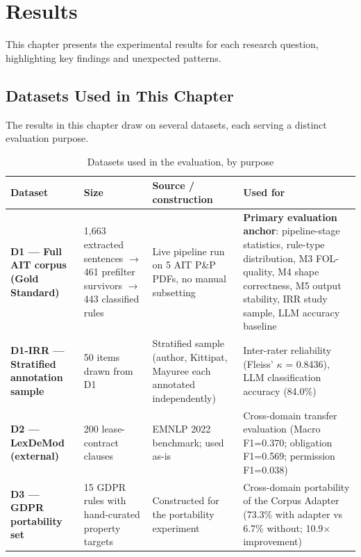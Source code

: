 \chapter{Results}
\label{ch:results}

This chapter presents the experimental results for each research question, highlighting key findings and unexpected patterns.

\section{Datasets Used in This Chapter}
\label{sec:datasets}

The results in this chapter draw on several datasets, each serving a distinct evaluation purpose.

\begin{table}[htbp]
\centering
\caption{Datasets used in the evaluation, by purpose}
\label{tab:datasets-used}
\small
\begin{tabular}{p{3cm}p{2.5cm}p{4cm}p{4cm}}
\toprule
\textbf{Dataset} & \textbf{Size} & \textbf{Source / construction} & \textbf{Used for} \\
\midrule
\textbf{D1 — Full AIT corpus (Gold Standard)} & 1,663 extracted sentences $\rightarrow$ 461 prefilter survivors $\rightarrow$ 443 classified rules & Live pipeline run on 5 AIT P\&P PDFs, no manual subsetting & \textbf{Primary evaluation anchor}: pipeline-stage statistics, rule-type distribution, M3 FOL-quality, M4 shape correctness, M5 output stability, IRR study sample, LLM accuracy baseline \\
\midrule
\textbf{D1-IRR — Stratified annotation sample} & 50 items drawn from D1 & Stratified sample (author, Kittipat, Mayuree each annotated independently) & Inter-rater reliability (Fleiss' $\kappa$ = 0.8436), LLM classification accuracy (84.0\%) \\
\midrule
\textbf{D2 — LexDeMod (external)} & 200 lease-contract clauses & EMNLP 2022 benchmark; used as-is & Cross-domain transfer evaluation (Macro F1=0.370; obligation F1=0.569; permission F1=0.038) \\
\midrule
\textbf{D3 — GDPR portability set} & 15 GDPR rules with hand-curated property targets & Constructed for the portability experiment & Cross-domain portability of the Corpus Adapter (73.3\% with adapter vs 6.7\% without; 10.9$\times$ improvement) \\
\bottomrule
\end{tabular}
\end{table}

